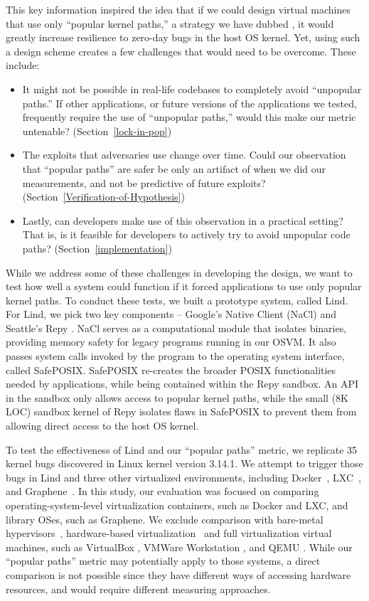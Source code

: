 This key information inspired the idea that if we could design virtual machines
 that use only ``popular kernel paths,'' a strategy we have dubbed \lip,
it would greatly increase resilience to zero-day bugs in the host OS kernel.
Yet, using such a design scheme creates a few challenges that would need to be
 overcome. These include:

\begin{itemize}
\item It might not be possible in real-life codebases to completely avoid ``unpopular paths.''
If other applications, or future versions of the applications we tested, frequently require the use of ``unpopular paths,'' would this make our metric untenable?
(Section~{\ref{lock-in-pop}})
\item The exploits that adversaries use change over time. Could our observation that ``popular paths'' are safer be only an artifact of when we did our measurements,
and not be predictive of future exploits? (Section~{\ref{Verification-of-Hypothesis}})
\item Lastly, can developers make use of this observation in a practical setting? That is, is it feasible for developers to actively try to avoid unpopular code paths?
(Section~{\ref{implementation}})
\end{itemize}

While we address some of these challenges in developing the \lip design,
we want to test how well a system could function if it forced applications to
use only popular kernel paths.
To conduct these tests, we built a prototype system, called Lind.
For Lind, we pick two key components -- Google's Native Client
(NaCl) \cite{NaCl-09} and Seattle's Repy \cite{Repy-10}.
NaCl serves as a computational module that isolates
binaries, providing memory safety for legacy programs running in our OSVM.
It also passes system calls invoked by the program to the operating system interface, called SafePOSIX.
SafePOSIX re-creates the broader POSIX functionalities needed by applications, while being contained within the Repy sandbox.
An API in the sandbox only allows access to popular kernel paths, while
the small (8K LOC) sandbox kernel of Repy isolates flaws in SafePOSIX
to prevent them from allowing direct access to the host OS kernel.

To test the effectiveness of Lind and our ``popular paths'' metric,
we replicate 35 kernel bugs discovered in Linux kernel version 3.14.1.  We attempt
to trigger those bugs in Lind and three other virtualized environments,
including Docker~\cite{Docker}, LXC~\cite{LXC}, and Graphene~\cite{Graphene-14}.
In this study, our evaluation was focused on comparing operating-system-level virtualization containers, such as Docker and LXC,
and library OSes, such as Graphene.
We exclude comparison with bare-metal hypervisors~\cite{Xen-03, VMWare-Server},
hardware-based virtualization~\cite{IntelVT, keller2010nohype} and full virtualization
virtual machines, such as VirtualBox \cite{VirtualBox}, VMWare Workstation \cite{VMWare-Workstation}, and QEMU \cite{QEMU}.
While our ``popular paths'' metric may potentially apply to those
systems, a direct comparison is not possible since they have different
ways of accessing hardware resources, and would require different measuring approaches.

